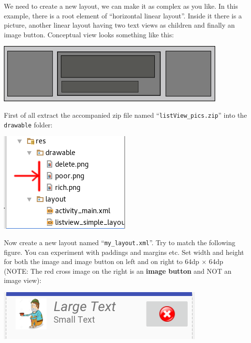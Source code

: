 We need to create a new layout, we can make it as complex as you like. In this example, there is a root element of ``horizontal linear layout''. Inside it there is a picture, another linear layout having two text views as children and finally an image button. Conceptual view looks something like this:

\begin{center}
	\includegraphics[scale=0.4]{chapters/ch10/images/36}
\end{center}


First of all extract the accompanied zip file named ``\texttt{listView\_pics.zip}'' into the \texttt{drawable} folder:

\begin{center}
	\includegraphics[scale=0.4]{chapters/ch10/images/37}
\end{center}

Now create a new layout named ``\texttt{my\_layout.xml}''. Try to match the following figure. You can experiment with paddings and margins etc. Set width and height for both the image and image button on left and on right to 64dp $\times$ 64dp (NOTE: The red cross image on the right is an \textbf{image button} and NOT an image view): 

\begin{center}
	\includegraphics[scale=0.4]{chapters/ch10/images/38}
\end{center}

